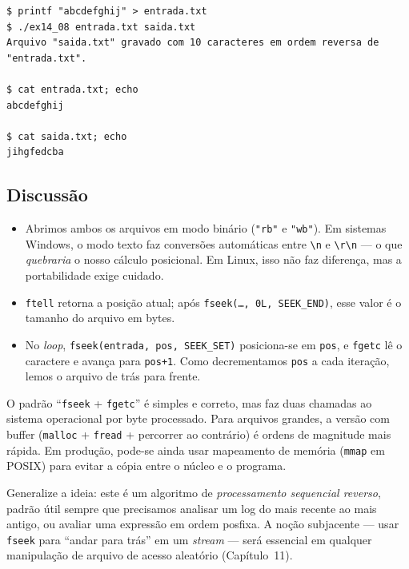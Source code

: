 \documentclass[11pt,a4paper]{article}
\begin{document}
\begin{saidabox}
\begin{lstlisting}[style=terminal]
$ printf "abcdefghij" > entrada.txt
$ ./ex14_08 entrada.txt saida.txt
Arquivo "saida.txt" gravado com 10 caracteres em ordem reversa de "entrada.txt".

$ cat entrada.txt; echo
abcdefghij

$ cat saida.txt; echo
jihgfedcba
\end{lstlisting}
\end{saidabox}

\subsection*{Discuss\~ao}

\begin{itemize}[leftmargin=*]
  \item Abrimos ambos os arquivos em modo bin\'ario (\texttt{"rb"} e \texttt{"wb"}). Em sistemas Windows, o modo texto faz convers\~oes autom\'aticas entre \texttt{\textbackslash n} e \texttt{\textbackslash r\textbackslash n} --- o que \emph{quebraria} o nosso c\'alculo posicional. Em Linux, isso n\~ao faz diferen\c{c}a, mas a portabilidade exige cuidado.
  \item \texttt{ftell} retorna a posi\c{c}\~ao atual; ap\'os \texttt{fseek(\dots, 0L, SEEK\_END)}, esse valor \'e o tamanho do arquivo em bytes.
  \item No \emph{loop}, \texttt{fseek(entrada, pos, SEEK\_SET)} posiciona-se em \texttt{pos}, e \texttt{fgetc} l\^e o caractere e avan\c{c}a para \texttt{pos+1}. Como decrementamos \texttt{pos} a cada itera\c{c}\~ao, lemos o arquivo de tr\'as para frente.
\end{itemize}

\begin{dicadesemp}
O padr\~ao ``\texttt{fseek} + \texttt{fgetc}'' \'e simples e correto, mas faz duas chamadas ao sistema operacional por byte processado. Para arquivos grandes, a vers\~ao com buffer (\texttt{malloc} + \texttt{fread} + percorrer ao contr\'ario) \'e ordens de magnitude mais r\'apida. Em produ\c{c}\~ao, pode-se ainda usar mapeamento de mem\'oria (\texttt{mmap} em POSIX) para evitar a c\'opia entre o n\'ucleo e o programa.
\end{dicadesemp}

\begin{obseng}
Generalize a ideia: este \'e um algoritmo de \emph{processamento sequencial reverso}, padr\~ao \'util sempre que precisamos analisar um log do mais recente ao mais antigo, ou avaliar uma express\~ao em ordem posfixa. A no\c{c}\~ao subjacente --- usar \texttt{fseek} para ``andar para tr\'as'' em um \emph{stream} --- ser\'a essencial em qualquer manipula\c{c}\~ao de arquivo de acesso aleat\'orio (Cap\'itulo~11).
\end{obseng}
\end{document}
